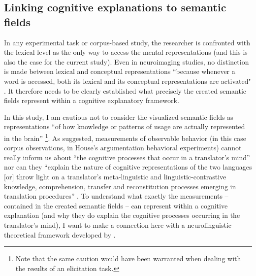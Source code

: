 \subsection{Linking cognitive explanations to semantic fields}
\label{sec:5.1.2}  
In any experimental task or corpus-based study, the researcher is confronted with the lexical level as the only way to access the mental representations (and this is also the case for the current study). Even in neuroimaging studies, no distinction is made between lexical and conceptual representations “because whenever a word is accessed, both its lexical and its conceptual representations are activated" \citep[200--201]{paradis_neurolinguistic_2004}. It therefore needs to be clearly established what precisely the created semantic fields represent within a cognitive explanatory framework.

In this study, I am cautious not to consider the visualized semantic fields as representations “of how knowledge or patterns of usage are actually represented in the brain” \citep[146]{divjak_structuring_2010}\footnote{Note that the same caution would have been warranted when dealing with the results of an elicitation task.}. As \citet[51]{house_towards_2013} suggested, measurements of observable behavior (in this case corpus observations, in House’s argumentation behavioral experiments) cannot really inform us about “the cognitive processes that occur in a translator’s mind” nor can they “explain the nature of cognitive representations of the two languages [or] throw light on a translator’s meta-linguistic and linguistic-contrastive knowledge, comprehension, transfer and reconstitution processes emerging in translation procedures” \citep[50--51]{house_towards_2013}. To understand what exactly the measurements – contained in the created semantic fields – can represent within a cognitive explanation (and why they do explain the cognitive processes occurring in the translator’s mind), I want to make a connection here with a neurolinguistic theoretical framework developed by \citet{paradis_neurolinguistic_2004, kecskes_neurofunctional_2007}. 

